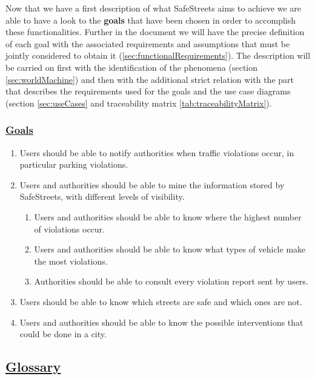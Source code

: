 	 Now that we have a first description of what SafeStreets aims to achieve we are able to have a look to the \textbf{goals} that have been chosen in order to accomplish these functionalities. Further in the document we will have the precise definition of each goal with the associated requirements and assumptions that must be jointly considered to obtain it (\ref{sec:functionalRequirements}). The description will be carried on first with the identification of the phenomena (section \ref{sec:worldMachine}) and then with the additional strict relation with the part that describes the requirements used for the goals and the use case diagrams (section \ref{sec:useCases} and traceability matrix \ref{tab:traceabilityMatrix}). 
	
	\subsubsection[Goals]{\hyperlink{toc}{Goals}}
		\label{sec:goals}
		\begin{enumerate}[label=\textbf{G\arabic*}]
			\item \label{goal:notification} Users should be able to notify authorities when traffic violations occur, in particular parking violations.
			\item \label{goal:mining} Users and authorities should be able to mine the information stored by SafeStreets, with different levels of visibility.
				\begin{enumerate}[label=\textbf{G2\Alph*}]
					\item \label{goal:miningA} Users and authorities should be able to know where the highest number of violations occur.
					\item \label{goal:miningB} Users and authorities should be able to know what types of vehicle make the most violations.
					\item \label{goal:miningC} Authorities should be able to consult every violation report sent by users.
				\end{enumerate}
			\item \label{goal:safety} Users should be able to know which streets are safe and which ones are not.
			\item \label{goal:intervention} Users and authorities should be able to know the possible interventions that could be done in a city.
		\end{enumerate}
	
\subsection[Glossary]{\hyperlink{toc}{Glossary}} %
	\label{sec:glossary}
